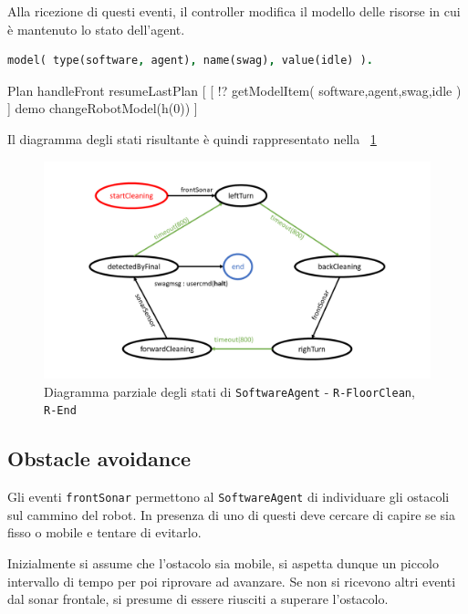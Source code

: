 \documentclass{../llncs}
\newcommand{\codescript}[1]{{\mbox{\small{\texttt{#1}}}}\xspace}
\newcommand{\code}[1]{{\color{blue}\small{\texttt{#1}}}}
\newcommand{\labelfig}[1]{\label{fig:#1}}
\newcommand{\xf}[1]{\figurename~\ref{fig:#1}}
\begin{document}
Alla ricezione di questi eventi, il controller modifica il modello delle risorse in cui è mantenuto lo stato dell'agent.\\

\begin{lstlisting}[language=Prolog, keywordstyle=\color{black}, caption={resourceModel.pl}]
% Modello dell'agent
model( type(software, agent), name(swag), value(idle) ).
\end{lstlisting}

\begin{qacode}[caption={Gestione di \codescript{frontSonar} da parte del \texttt{Controller}}]
Plan handleFront resumeLastPlan [
	[ !? getModelItem( software,agent,swag,idle ) ]
		demo changeRobotModel(h(0))
]
\end{qacode}

Il diagramma degli stati risultante è quindi rappresentato nella \xf{floorClean}

\begin{figure}[!htb]
\centering
\includegraphics[scale=0.4]{img/stateDiagramCleaning.png}
\caption{Diagramma parziale degli stati di \texttt{SoftwareAgent} - \code{R-FloorClean}, \code{R-End}}\labelfig{floorClean}
\end{figure}

\subsection{Obstacle avoidance}
Gli eventi \codescript{frontSonar} permettono al  \texttt{SoftwareAgent} di individuare gli ostacoli sul cammino del robot. In presenza di uno di questi deve cercare di capire se sia fisso o mobile e tentare di evitarlo.

Inizialmente si assume che l'ostacolo sia mobile, si aspetta dunque un piccolo intervallo di tempo per poi riprovare ad avanzare. Se non si ricevono altri eventi dal sonar frontale, si presume di essere riusciti a superare l'ostacolo.\\
\end{document}
